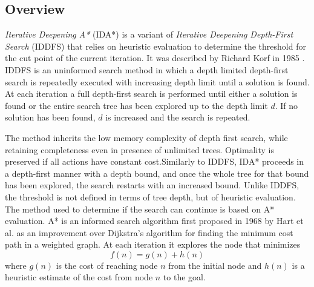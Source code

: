 \subsection{Overview}

\textit{Iterative Deepening A*} (IDA*) is a variant of \textit{Iterative Deepening Depth-First Search} (IDDFS) that relies on heuristic evaluation to determine the threshold for the cut point of the current iteration. It was described by Richard Korf in 1985 \cite{Korf:1985:DIO:4433.4436}. 
IDDFS is an uninformed search method in which a depth limited depth-first search is repeatedly executed with increasing depth limit until a solution is found. At each iteration a full depth-first search is performed until either a solution is found or the entire search tree has been explored up to the depth limit $d$. If no solution has been found, $d$ is increased and the search is repeated. 

\medskip\noindent
The method inherits the low memory complexity of depth first search, while retaining completeness even in presence of unlimited trees. Optimality is preserved if all actions have constant cost.Similarly to IDDFS, IDA* proceeds in a depth-first manner with a depth bound, and once the whole tree for that bound has been explored, the search restarts with an increased bound. Unlike IDDFS, the threshold is not defined in terms of tree depth, but of heuristic evaluation. The method used to determine if the search can continue is based on A* evaluation. A* is an informed search algorithm first proposed in 1968 by Hart et al. \cite{Hart1968} as an improvement over Dijkstra's algorithm for finding the minimum cost path in a weighted graph. At each iteration it explores the node that minimizes
\begin{equation}
    f(n) = g(n)+h(n)
\end{equation}
where $g(n)$ is the cost of reaching node $n$ from the initial node and $h(n)$ is a heuristic estimate of the cost from node $n$ to the goal.

